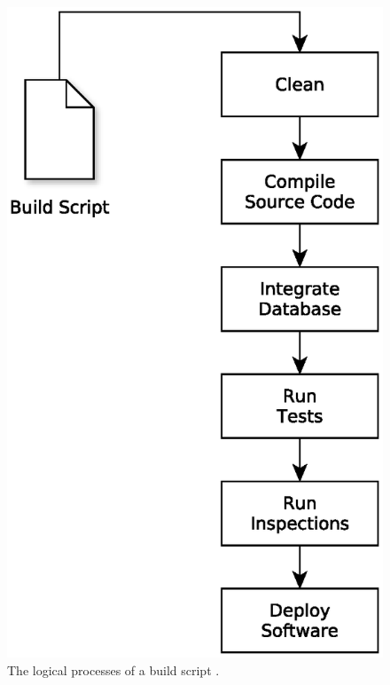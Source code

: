 \begin{figure}[H]
    \centering
    \includegraphics[scale=0.5]{yEd/the_logical_processes_of_a_build_script.eps}
    \caption{The logical processes of a build script \cite{CIbook}.}
    \label{fig:lpobs}
\end{figure}


